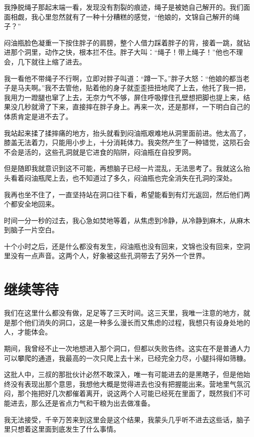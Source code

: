 我挣脱绳子那起末端一看，发现没有割裂的痕迹，绳子是被她自己解开的。我们面面相觑，我心里忽然就有了一种十分糟糕的感觉，“他娘的，文锦自己解开的绳子？”

闷油瓶脸色凝重一下按住胖子的肩膀，整个人借力踩着胖子的背，接着一跳，就钻进那个洞里，动作之快，根本拦不住。胖子大叫：“绳子！带上绳子！”他也不理会，几下就往上缩了进去。

我一看他不带绳子不行啊，立即对胖子叫道：“蹲一下。”胖子大怒：“他娘的都当老子是马夫啊。”我不去管他，贴着他的身子就歪歪扭扭地爬了上去，他托了我一把，我用力一蹬腿也窜了上去，无奈力气不够，屏住呼吸撑住孔壁想把脚也提上来，结果没几秒就滑了下来，直接摔在胖子身上。再来一次，还是那样，一下明白自己的体质肯定是进不去了。

我站起来揉了揉摔痛的地方，抬头就看到闷油瓶艰难地从洞里面前进。他太高了，膝盖无法着力，只能用小步上，十分消耗体力。我突然产生了一种错觉，这陨石会不会是活的，这些孔洞就是它进食的陷阱，闷油瓶在自投罗网。

但是随即我就意识到这不可能，再想脑子已经一片混乱，无法思考了。我就这么抬头看着闷油瓶爬上去，也不知道过了多久，闷油瓶也完全消失在孔洞的深处。

我再也坐不住了，一直坚持站在洞口往下看，希望能看到有灯光返回，然后他们两个都安全地回来。

时间一分一秒的过去，我心急如焚地等着，从焦虑到冷静，从冷静到麻木，从麻木到脑子一片空白。

十个小时之后，还是什么都没有发生，闷油瓶也没有回来，文锦也没有回来，空洞里没有一点声音。这两个人，好象被这些孔洞带去了另外一个世界。

\chapter{继续等待}

我们在这里什么都没有做，足足等了三天时间。这三天里，我唯一注意的地方，就是那个他们消失的洞口，这是一种多么漫长而又焦虑的过程，我想只有设身处地的人，才能体会。

期间，我曾经不止一次地想进入那个洞口，但都以失败告终。这实在不是普通人力可以攀爬的通道，我最高的一次只爬上去十米，已经完全力尽，小腿抖得如筛糠。

这批人中，三叔的那批伙计必然不敢深入，唯一有可能进去的是黑瞎子，但是他始终没有表现出那个意思，我想他大概是觉得进去也没有把握能出来。营地里气氛沉闷，那个拖把好几次都催着离开，说这两个人可能已经死在里面了，既然我们不可能进去，那么还是省点力气和干粮为出去做准备。

我无法接受，千辛万苦来到这里会是这个结果，我蒙头几乎听不进去这些话，脑子里只想着这里面到底发生了什么事情。

